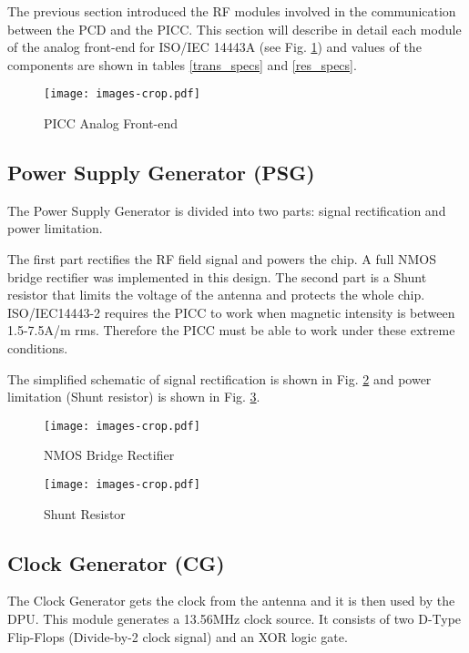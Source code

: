 The previous section introduced the RF modules involved in the communication between the PCD and the PICC. This section will describe in detail each module of the analog front-end for ISO/IEC 14443A (see Fig. \ref{fig:afe}) and values of the components are shown in tables \ref{trans_specs} and \ref{res_specs}.

\begin{figure}[]
  \centering
  \texttt{[image: images-crop.pdf]}
  \caption{PICC Analog Front-end}
  \label{fig:afe}
\end{figure}

\subsection{Power Supply Generator (PSG)}

The Power Supply Generator is divided into two parts: signal rectification and power limitation.

The first part rectifies the RF field signal and powers the chip. A full NMOS bridge rectifier \cite{rfid_rect1}\cite{rfid_rect2} was implemented in this design. The second part is a Shunt resistor that limits the voltage of the antenna and protects the whole chip. ISO/IEC14443-2 requires the PICC to work when magnetic intensity is between 1.5-7.5A/m rms. Therefore the PICC must be able to work under these extreme conditions.  

The simplified schematic of signal rectification is shown in Fig. \ref{fig:rect} and power limitation (Shunt resistor) is shown in Fig. \ref{fig:shunt}.

\begin{figure}[h]
  \centering
  \texttt{[image: images-crop.pdf]}
  \caption{NMOS Bridge Rectifier}
  \label{fig:rect}
\end{figure}

\begin{figure}[h]
  \centering
  \texttt{[image: images-crop.pdf]}
  \caption{Shunt Resistor}
  \label{fig:shunt}
\end{figure}


\subsection{Clock Generator (CG)}

The Clock Generator gets the clock from the antenna and it is then used by the DPU. This module generates a 13.56MHz clock source. It consists of two D-Type Flip-Flops (Divide-by-2 clock signal) and an XOR logic gate. 

